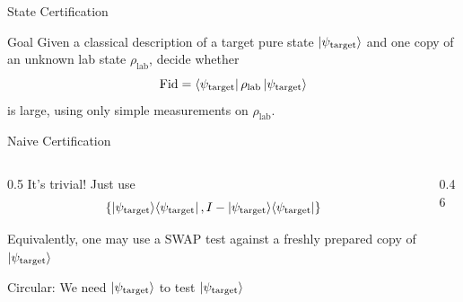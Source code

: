 \begin{frame}{State Certification}
    \begin{center}
        \resizebox{0.78\textwidth}{!}{}
    \end{center}

    \pause
    \vspace{-0.3em}
    \begin{block}{Goal}
        Given a classical description of a target pure state $\ket{\psi_{\text{target}}}$ and one copy of an unknown lab state $\rho_{\text{lab}}$, decide whether
        \[
            \mathrm{Fid}=\bra{\psi_{\text{target}}}\rho_{\text{lab}}\ket{\psi_{\text{target}}}
        \]
        is large, using only simple measurements on $\rho_{\text{lab}}$.
    \end{block}
\end{frame}

\begin{frame}{Naive Certification}
    \begin{columns}[T,onlytextwidth]
        \begin{column}{0.5\textwidth}
            It's trivial! Just use
            \[
                \left\{\ket{\psi_{\text{target}}}\!\bra{\psi_{\text{target}}},
                I-\ket{\psi_{\text{target}}}\!\bra{\psi_{\text{target}}}\right\}
            \]

            \pause
            \vspace{0.5em}
            Equivalently, one may use a SWAP test against a freshly prepared copy of $\ket{\psi_{\text{target}}}$
    \pause

    \vspace{0.3em}
      Circular: We need $\ket{\psi_{\text{target}}}$ to test $\ket{\psi_{\text{target}}}$
        \end{column}
        \begin{column}{0.46\textwidth}
            \centering
            \resizebox{\linewidth}{!}{}
        \end{column}
    \end{columns}

\end{frame}

